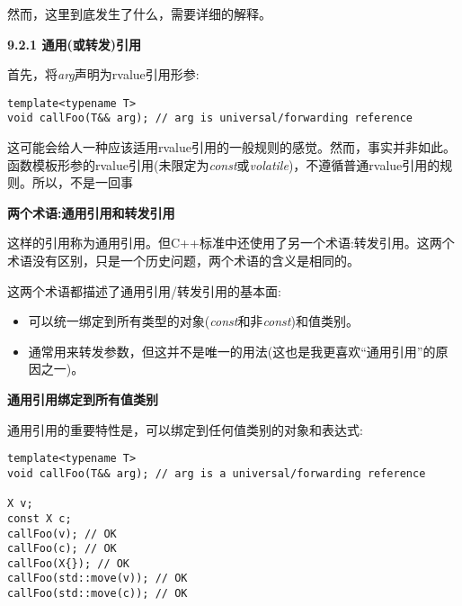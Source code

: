 然而，这里到底发生了什么，需要详细的解释。\par

\hspace*{\fill} \par %
\textbf{9.2.1 通用(或转发)引用}

首先，将\textit{arg}声明为rvalue引用形参:\par

\begin{lstlisting}[caption={}]
template<typename T>
void callFoo(T&& arg); // arg is universal/forwarding reference
\end{lstlisting}

这可能会给人一种应该适用rvalue引用的一般规则的感觉。然而，事实并非如此。函数模板形参的rvalue引用(未限定为\textit{const}或\textit{volatile})，不遵循普通rvalue引用的规则。所以，不是一回事\par

\hspace*{\fill} \par %
\textbf{两个术语:通用引用和转发引用}

这样的引用称为通用引用。但C++标准中还使用了另一个术语:转发引用。这两个术语没有区别，只是一个历史问题，两个术语的含义是相同的。\par

这两个术语都描述了通用引用/转发引用的基本面:\par

\begin{itemize}
	\item 可以统一绑定到所有类型的对象(\textit{const}和非\textit{const})和值类别。
	\item 通常用来转发参数，但这并不是唯一的用法(这也是我更喜欢“通用引用”的原因之一)。
\end{itemize}

\hspace*{\fill} \par %
\textbf{通用引用绑定到所有值类别}

通用引用的重要特性是，可以绑定到任何值类别的对象和表达式:\par

\begin{lstlisting}[caption={}]
template<typename T>
void callFoo(T&& arg); // arg is a universal/forwarding reference

X v;
const X c;
callFoo(v); // OK
callFoo(c); // OK
callFoo(X{}); // OK
callFoo(std::move(v)); // OK
callFoo(std::move(c)); // OK
\end{lstlisting}

